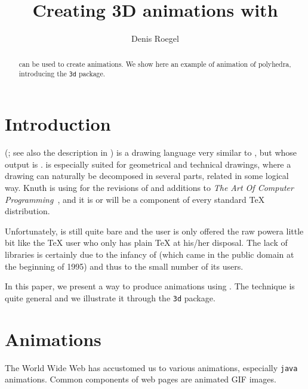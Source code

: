 \documentclass[nonumber,harvardcite]{ltugboat}
\begin{document}

\title{Creating 3D animations with \MP}
\author{Denis Roegel}
\address{CRIN (Centre de Recherche en Informatique de Nancy)\\
         B\^atiment LORIA\\
         BP 239\\
         54506 Vand\oe uvre-l\`es-Nancy\\ 
         FRANCE}
\maketitle

\begin{abstract}
\MP{} can be used to create animations. We show here an example
of animation of polyhedra, introducing the \texttt{3d} package.
\end{abstract}

\section{Introduction}

\MP{} (; see also the description in 
) 
is a drawing language very similar to \MF,
but whose output is \PS. \MP{} is especially suited for geometrical
and technical drawings, where a drawing can naturally be decomposed
in several parts, related in some logical way. 
Knuth is using \MP{}  for the revisions of and additions to 
\emph{The Art Of Computer Programming}~\cite{knuth1997},
and it is or will be a component of every standard \TeX{} distribution.

Unfortunately, \MP{} is still quite bare and the user is only offered
the raw power\Dash a little bit like the \TeX{} user who only has
plain \TeX{} at his/her disposal. The lack of libraries is certainly 
due to the infancy of \MP{} (which came in the public domain at the 
beginning of 1995) and thus to the small number of its users.

In this paper, we present a way to produce animations using \MP.
The technique is quite general and we illustrate it through the \texttt{3d}
package.

\section{Animations}

The World Wide Web has accustomed us to various animations, 
especially \texttt{java} animations. 
Common components of web pages are animated GIF images.
\end{document}
